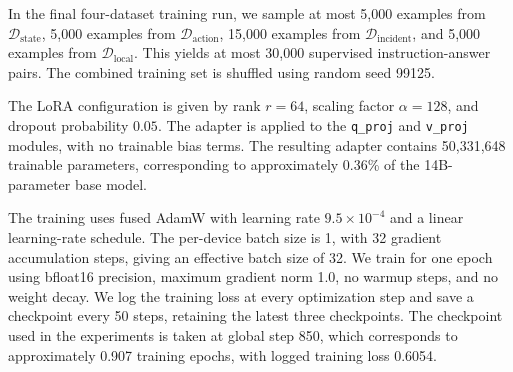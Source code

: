 In the final four-dataset training run, we sample at most 5,000 examples from
$\mathcal{D}_{\mathrm{state}}$, 5,000 examples from
$\mathcal{D}_{\mathrm{action}}$, 15,000 examples from
$\mathcal{D}_{\mathrm{incident}}$, and 5,000 examples from
$\mathcal{D}_{\mathrm{local}}$. This yields at most 30,000 supervised
instruction-answer pairs. The combined training set is shuffled using random
seed 99125.

The LoRA configuration is given by rank $r=64$, scaling factor
$\alpha=128$, and dropout probability $0.05$. The adapter is applied to the
\texttt{q\_proj} and \texttt{v\_proj} modules, with no trainable bias terms.
The resulting adapter contains 50,331,648 trainable parameters, corresponding
to approximately 0.36\% of the 14B-parameter base model.

The training uses fused AdamW with learning rate $9.5\times 10^{-4}$ and a
linear learning-rate schedule. The per-device batch size is 1, with 32 gradient
accumulation steps, giving an effective batch size of 32. We train for one
epoch using bfloat16 precision, maximum gradient norm 1.0, no warmup steps, and
no weight decay. We log the training loss at every optimization step and save a
checkpoint every 50 steps, retaining the latest three checkpoints. The
checkpoint used in the experiments is taken at global step 850, which
corresponds to approximately 0.907 training epochs, with logged training loss
0.6054.

